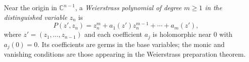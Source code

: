 
Near the origin in $\mathbb C^{n-1}$, a \emph{Weierstrass polynomial of degree $m\ge1$ in the distinguished variable $z_n$} is
\[
P(z',z_n)=z_n^m+a_1(z')z_n^{m-1}+\cdots+a_m(z'),
\]
where $z'=(z_1,\ldots,z_{n-1})$ and each coefficient $a_j$ is holomorphic near $0$ with $a_j(0)=0$. Its coefficients are germs in the base variables; the monic and vanishing conditions are those appearing in the Weierstrass preparation theorem.
